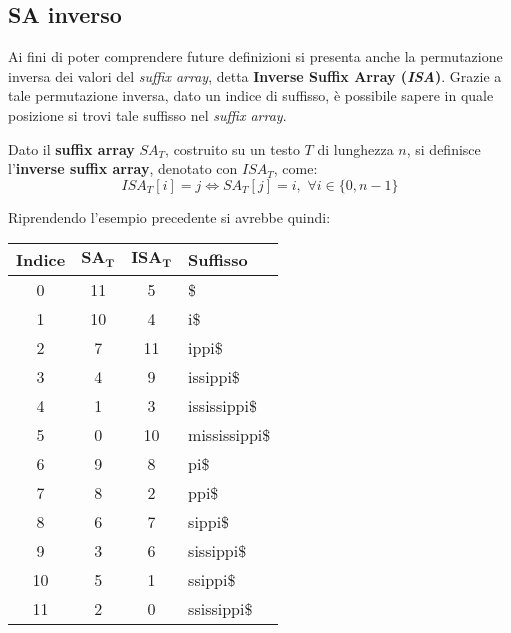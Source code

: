 \subsection{SA inverso}
Ai fini di poter comprendere future definizioni si presenta anche la
permutazione inversa dei valori del \textit{suffix array}, detta
\textbf{Inverse Suffix Array (\textit{ISA})}. Grazie a tale permutazione
inversa, dato un indice di suffisso, è possibile sapere in quale posizione si
trovi tale suffisso nel \textit{suffix array}.  
\begin{definizione}
  Dato il \textbf{suffix array} $SA_T$, costruito su un testo $T$ di lunghezza
  $n$, si definisce l'\textbf{inverse suffix array}, denotato con $ISA_T$, come:
  \[ISA_T[i]=j\iff SA_T[j]=i,\,\,\forall i\in\{0,n-1\}\]
\end{definizione}

\begin{esempio}
  Riprendendo l'esempio precedente si avrebbe quindi:
  \begin{table}[H]
    \centering
    \footnotesize
    \begin{tabular}{c|c|c|l} 
      \textbf{Indice} & $\mathbf{SA_T}$ & $\mathbf{ISA_T}$ & \textbf{Suffisso}\\ 
      \hline
      0 & 11 & 5 & \$\\
      1 & 10 & 4 & i\$\\
      2 & 7 & 11 & ippi\$\\
      3 & 4 & 9 & issippi\$\\
      4 & 1 & 3 & ississippi\$\\
      5 & 0 & 10 & mississippi\$\\
      6 & 9 & 8 & pi\$\\
      7 & 8 & 2 & ppi\$\\
      8 & 6 & 7 & sippi\$\\
      9 & 3 & 6 & sissippi\$\\
      10 & 5 & 1 & ssippi\$\\
      11 & 2 & 0 & ssissippi\$\\
    \end{tabular}
  \end{table}
\end{esempio}
